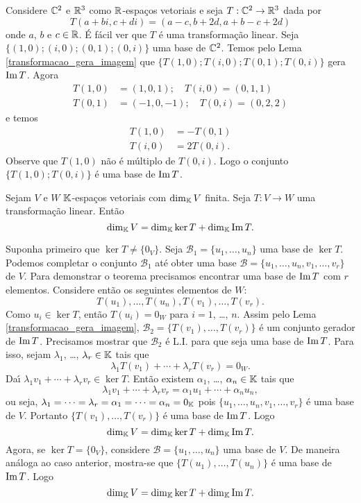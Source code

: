\begin{exemplo}
	Considere $\mathbb{C}^2$ e $\mathbb{R}^3$ como $\mathbb{R}$-espa\c{c}os vetoriais e seja $T : \mathbb{C}^2 \to \mathbb{R}^3$ dada por
	\[
		T(a+bi, c+di) = (a - c, b + 2d, a + b - c + 2d)
	\]
	onde $a$, $b$ e $c \in \mathbb{R}$. \'E f\'acil ver que $T$ \'e uma transforma\c{c}\~ao linear. Seja $\{(1,0);(i,0);(0,1);(0,i)\}$ uma base de $\mathbb{C}^2$. Temos pelo Lema \ref{transformacao_gera_imagem} que $\{T(1,0);T(i,0);T(0,1);T(0,i)\}$ gera ${\rm Im\,} T$. Agora
	\begin{align*}
		T(1,0) &= (1,0,1);\quad T(i,0) = (0,1,1)\\
		T(0,1) &= (-1,0,-1);\quad T(0,i) = (0,2,2)
	\end{align*}
	e temos
	\begin{align*}
		T(1,0) &= -T(0,1)\\
		T(i,0) &= 2T(0,i).
	\end{align*}
	Observe que $T(1,0)$ n\~ao \'e m\'ultiplo de $T(0,i)$. Logo o conjunto $\{T(1,0); T(0,i)\}$ \'e uma base de ${\rm Im\,} T$.
\end{exemplo}

\begin{teorema}\label{teorema_do_nucleo_e_da_imagem}
	Sejam $V$ e $W$ $\mathbb{K}$-espa\c{c}os vetoriais com $\dim_{\mathbb{K}}V$ finita. Seja $T : V \to W$ uma transforma\c{c}\~ao linear. Ent\~ao
	\[
		\dim_{\mathbb{K}}V = \dim_{\mathbb{K}}\ker T + \dim_{\mathbb{K}}{\rm Im\,} T.
	\]
\end{teorema}
\begin{prova}
	Suponha primeiro que $\ker T \ne \{0_V\}$. Seja $\mathcal{B}_1 = \{u_1, \dots, u_n\}$ uma base de $\ker T$. Podemos completar o conjunto $\mathcal{B}_1$ at\'e obter uma base $\mathcal{B} = \{u_1, \dots, u_n, v_1, \dots, v_r\}$ de $V$. Para demonstrar o teorema precisamos encontrar uma base de ${\rm Im\,} T$ com $r$ elementos. Considere ent\~ao os seguintes elementos de $W$:
	\[
		T(u_1), \dots, T(u_n), T(v_1), \dots, T(v_r).
	\]
	Como $u_i \in \ker T$, ent\~ao $T(u_i) = 0_W$ para $i = 1$, \dots, $n$. Assim pelo Lema \ref{transformacao_gera_imagem}, $\mathcal{B}_2 = \{T(v_1), \dots, T(v_r)\}$ \'e um conjunto gerador de ${\rm Im\,} T$. Precisamos mostrar que $\mathcal{B}_2$ \'e L.I. para que seja uma base de ${\rm Im\,} T$. Para isso, sejam $\lambda_1$, \dots, $\lambda_r \in \mathbb{K}$ tais que
	\[
		\lambda_1T(v_1) + \cdots + \lambda_rT(v_r) = 0_W.
	\]
	Da{\'\i} $\lambda_1v_1 + \cdots + \lambda_rv_r \in \ker T$. Ent\~ao existem $\alpha_1$, \dots, $\alpha_n \in \mathbb{K}$ tais que
	\[
		\lambda_1v_1 + \cdots + \lambda_rv_r = \alpha_1u_1 + \cdots + \alpha_nu_n,
	\]
	ou seja, $\lambda_1 = \cdots = \lambda_r = \alpha_1 = \cdots = \alpha_n = 0_{\mathbb{K}}$ pois $\{u_1, \dots, u_n, v_1, \dots, v_r\}$ \'e uma base de $V$. Portanto $\{T(v_1), \dots, T(v_r)\}$ \'e uma base de ${\rm Im\,} T$. Logo
	\[
		\dim_{\mathbb{K}}V = \dim_{\mathbb{K}}\ker T + \dim_{\mathbb{K}}{\rm Im\,} T.
	\]
	Agora, se $\ker T = \{0_V\}$, considere $\mathcal{B} = \{u_1, \dots, u_n\}$ uma base de $V$. De maneira an\'aloga ao caso anterior, mostra-se que $\{T(u_1), \dots, T(u_n)\}$ \'e uma base de ${\rm Im\,} T$. Logo
	\[
		\dim_{\mathbb{K}}V = \dim_{\mathbb{K}}\ker T + \dim_{\mathbb{K}}{\rm Im\,} T.
	\]
\end{prova}


